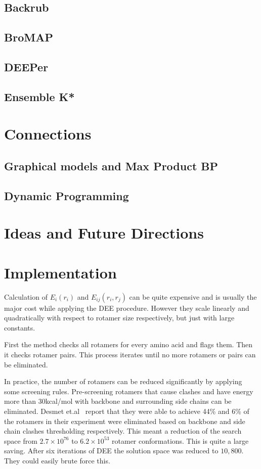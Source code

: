 \documentclass{article}
\begin{document}
\subsection{Backrub}

\subsection{BroMAP}

\subsection{DEEPer}

\subsection{Ensemble K*}

\section{Connections}
\subsection{Graphical models and Max Product BP}

\subsection{Dynamic Programming}


\section{Ideas and Future Directions}

\section{Implementation}
Calculation  of $E_i(r_i)$ and $E_{ij}(r_i,r_j)$ can be quite expensive and is usually the major cost while applying the DEE procedure. However they scale linearly and quadratically with respect to rotamer size respectively, but just with large constants. 

First the method checks all rotamers for every amino acid and flags them. Then it checks rotamer pairs. This process iterates until no more rotamers or pairs can be eliminated. 

In practice, the number of rotamers can be reduced significantly by applying some screening rules. Pre-screening rotamers that cause clashes and have energy more than 30kcal/mol with backbone and surrounding side chains can be eliminated. Desmet et.al~\cite{Desmet1992} report  that they were able to achieve 44\% and 6\% of the rotamers in their experiment were eliminated based on backbone and side chain clashes thresholding respectively. This meant a reduction of the search space from $2.7\times10^{76}$ to $6.2\times10^{53}$ rotamer conformations. This is quite a large saving. After six iterations of DEE the solution space was reduced to $10,800$. They could easily brute force this. 
\end{document}
